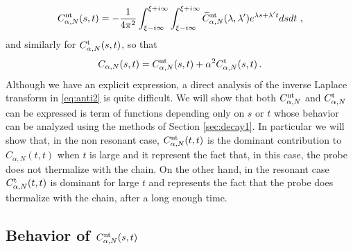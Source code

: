 \documentclass[11pt]{article}
\numberwithin{equation}{section}
\numberwithin{theorem}{section}
\newcommand{\matht}[1]{\texorpdfstring{#1}{}}
\def\tilde#1{\widetilde{#1}}
\begin{document}
\begin{equation}\label{eq:anti2}
C^{\rm nt}_{\alpha,N}(s,t) =-\frac{1}{4\pi^2}
\int_{\xi-i\infty}^{\xi+i\infty}\int_{\xi-i\infty}^{\xi+i\infty}\tilde
C_{\alpha,N}^{\rm nt}(\lambda,\lambda')e^{\lambda s +\lambda' t}
dsdt\ ,
\end{equation}
and similarly for $C^{\rm t}_{\alpha,N}(s,t)$, so that
\begin{equation}\label{eq:Csplit}
 C_{\alpha,N}(s,t)=C^{\rm nt}_{\alpha,N}(s,t)+\alpha^2  C^{\rm t}_{\alpha,N}(s,t)\, .
\end{equation}
Although we have an explicit expression, a direct analysis of the inverse Laplace transform in \eqref{eq:anti2} is
quite
difficult. We will show that both  $C_{\alpha,N}^{\rm nt}$ and $C_{\alpha,N}^{\rm t}$ can be expressed is term of
functions depending only on $s$ or $t$ whose behavior can be analyzed using the methods of Section \ref{sec:decay1}. In
particular we will show that, in the non resonant case, $C^{\rm nt}_{\alpha,N}(t,t)$ is the dominant contribution to
$C_{\alpha,N}(t,t)$ when $t$ is large and it represent the fact that, in this case, the probe does not thermalize with
the chain. On the other hand, in the resonant case $C^{\rm t}_{\alpha,N}(t,t)$ is dominant for large $t$ and represents
the fact that the probe does thermalize with the chain, after a long enough time.

\subsection{Behavior of \matht{$C^{\rm nt}_{\alpha,N}(s,t)$}}\label{subsec:C12}
\end{document}
